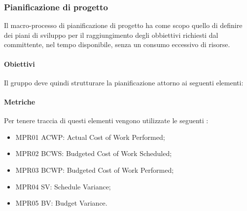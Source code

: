 \subsubsection{Pianificazione di progetto}
Il macro-processo di pianificazione di progetto ha come scopo quello di definire dei piani di sviluppo per il raggiungimento degli obbiettivi richiesti dal committente, nel tempo disponibile, senza un consumo eccessivo di risorse.

\paragraph{Obiettivi}
Il gruppo \gruppo{} deve quindi strutturare la pianificazione attorno ai seguenti elementi:

\paragraph{Metriche}%
Per tenere traccia di questi elementi vengono utilizzate le seguenti :
\begin{itemize}
\item MPR01 ACWP: Actual Cost of Work Performed;
\item MPR02 BCWS: Budgeted Cost of Work Scheduled;
\item MPR03 BCWP: Budgeted Cost of Work Performed;
\item MPR04 SV: Schedule Variance;
\item MPR05 BV: Budget Variance.
\end{itemize}

